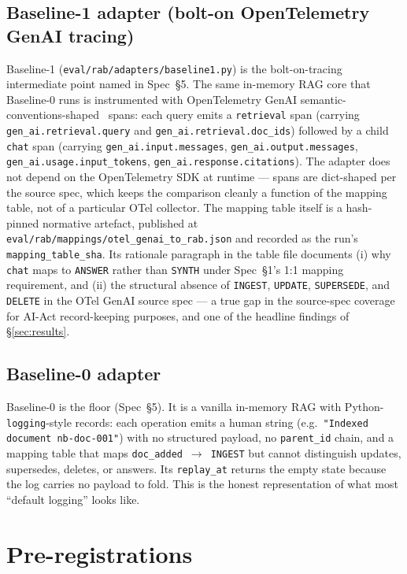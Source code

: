 \documentclass[11pt,a4paper]{article}
\begin{document}
\subsection{Baseline-1 adapter (bolt-on OpenTelemetry GenAI tracing)}
Baseline-1 (\texttt{eval/rab/adapters/baseline1.py}) is the bolt-on-tracing intermediate point named in Spec~§5. The same in-memory RAG core that Baseline-0 runs is instrumented with OpenTelemetry GenAI semantic-conventions-shaped~\cite{otel2024genaisemconv} spans: each query emits a \texttt{retrieval} span (carrying \texttt{gen\_ai.retrieval.query} and \texttt{gen\_ai.retrieval.doc\_ids}) followed by a child \texttt{chat} span (carrying \texttt{gen\_ai.input.messages}, \texttt{gen\_ai.output.messages}, \texttt{gen\_ai.usage.input\_tokens}, \texttt{gen\_ai.response.citations}). The adapter does not depend on the OpenTelemetry SDK at runtime --- spans are dict-shaped per the source spec, which keeps the comparison cleanly a function of the mapping table, not of a particular OTel collector. The mapping table itself is a hash-pinned normative artefact, published at \texttt{eval/rab/mappings/otel\_genai\_to\_rab.json} and recorded as the run's \texttt{mapping\_table\_sha}. Its rationale paragraph in the table file documents (i) why \texttt{chat} maps to \texttt{ANSWER} rather than \texttt{SYNTH} under Spec~§1's 1:1 mapping requirement, and (ii) the structural absence of \texttt{INGEST}, \texttt{UPDATE}, \texttt{SUPERSEDE}, and \texttt{DELETE} in the OTel GenAI source spec --- a true gap in the source-spec coverage for AI-Act record-keeping purposes, and one of the headline findings of §\ref{sec:results}.

\subsection{Baseline-0 adapter}
Baseline-0 is the floor (Spec~§5). It is a vanilla in-memory RAG with Python-\texttt{logging}-style records: each operation emits a human string (e.g.~\texttt{"Indexed document nb-doc-001"}) with no structured payload, no \texttt{parent\_id} chain, and a mapping table that maps \texttt{doc\_added}~$\to$~\texttt{INGEST} but cannot distinguish updates, supersedes, deletes, or answers. Its \texttt{replay\_at} returns the empty state because the log carries no payload to fold. This is the honest representation of what most ``default logging'' looks like.

\section{Pre-registrations}
\label{sec:prereg}
\end{document}
